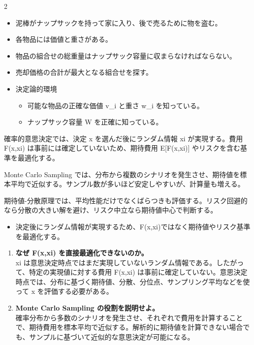 \clearpage
{}
\begin{multicols}{2}\footnotesize\raggedcolumns
{}
\begin{itemize}
\item 泥棒がナップサックを持って家に入り、後で売るために物を盗む。
\item 各物品には価値と重さがある。
\item 物品の組合せの総重量はナップサック容量に収まらなければならない。
\item 売却価格の合計が最大となる組合せを探す。
\item 決定論的環境
\begin{itemize}
\item 可能な物品の正確な価値 v\_i と重さ w\_i を知っている。
\item ナップサック容量 W を正確に知っている。
\end{itemize}
\end{itemize}
確率的意思決定では、決定 x を選んだ後にランダム情報 xi が実現する。費用 F(x,xi) は事前には確定していないため、期待費用 E[F(x,xi)] やリスクを含む基準を最適化する。\par

Monte Carlo Sampling では、分布から複数のシナリオを発生させ、期待値を標本平均で近似する。サンプル数が多いほど安定しやすいが、計算量も増える。\par

期待値-分散原理では、平均性能だけでなくばらつきも評価する。リスク回避的なら分散の大きい解を避け、リスク中立なら期待値中心で判断する。\par
{}
\begin{itemize}
\item 決定後にランダム情報が実現するため、F(x,xi)ではなく期待値やリスク基準を最適化する。
\end{itemize}
\begin{enumerate}
\item \textbf{なぜ F(x,xi) を直接最適化できないのか。}\\xi は意思決定時点ではまだ実現していないランダム情報である。したがって、特定の実現値に対する費用 F(x,xi) は事前に確定していない。意思決定時点では、分布に基づく期待値、分散、分位点、サンプリング平均などを使って x を評価する必要がある。
\item \textbf{Monte Carlo Sampling の役割を説明せよ。}\\確率分布から多数のシナリオを発生させ、それぞれで費用を計算することで、期待費用を標本平均で近似する。解析的に期待値を計算できない場合でも、サンプルに基づいて近似的な意思決定が可能になる。
\end{enumerate}
\end{multicols}

